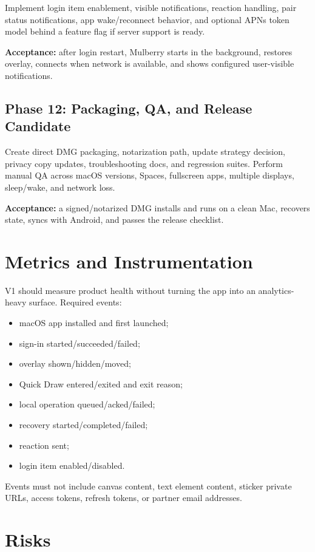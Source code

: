 \documentclass[11pt]{article}
\begin{document}
Implement login item enablement, visible notifications, reaction handling, pair status notifications, app wake/reconnect behavior, and optional APNs token model behind a feature flag if server support is ready.

\textbf{Acceptance:} after login restart, Mulberry starts in the background, restores overlay, connects when network is available, and shows configured user-visible notifications.

\subsection{Phase 12: Packaging, QA, and Release Candidate}

Create direct DMG packaging, notarization path, update strategy decision, privacy copy updates, troubleshooting docs, and regression suites. Perform manual QA across macOS versions, Spaces, fullscreen apps, multiple displays, sleep/wake, and network loss.

\textbf{Acceptance:} a signed/notarized DMG installs and runs on a clean Mac, recovers state, syncs with Android, and passes the release checklist.

\section{Metrics and Instrumentation}

V1 should measure product health without turning the app into an analytics-heavy surface. Required events:
\begin{itemize}
  \item macOS app installed and first launched;
  \item sign-in started/succeeded/failed;
  \item overlay shown/hidden/moved;
  \item Quick Draw entered/exited and exit reason;
  \item local operation queued/acked/failed;
  \item recovery started/completed/failed;
  \item reaction sent;
  \item login item enabled/disabled.
\end{itemize}

Events must not include canvas content, text element content, sticker private URLs, access tokens, refresh tokens, or partner email addresses.

\section{Risks}
\end{document}
